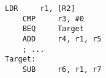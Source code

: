 \begin{lstlisting}[style=AsmStyle]
    LDR     r1, [R2]
    CMP     r3, #0
    BEQ     Target
    ADD     r4, r1, r5
    ; ...
Target:
    SUB     r6, r1, r7
\end{lstlisting}